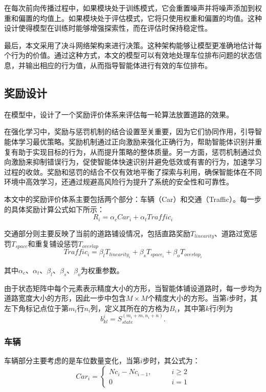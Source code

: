 在每次前向传播过程中，如果模块处于训练模式，它会重置噪声并将噪声添加到权重和偏置的均值上。如果模块处于评估模式，它将只使用权重和偏置的均值。这种设计使得模型在训练时能够增强探索性，而在评估时保持稳定性。

最后，本文采用了决斗网络架构来进行决策。这种架构能够让模型更准确地估计每个行为的价值。通过这种方式，本文的模型可以有效地处理车位排布问题的状态信息，并输出相应的行为值，从而指导智能体进行有效的车位排布。
\subsection{奖励设计}
在模型中，设计了一个奖励评价体系来评估每一轮算法放置道路的效果。

在强化学习中，奖励与惩罚机制的结合设置至关重要，因为它们协同作用，引导智能体学习最优策略。奖励机制通过正向激励来强化正确行为，帮助智能体识别并重复有助于实现目标的行为，从而提升策略的整体质量。另一方面，惩罚机制通过负向激励来抑制错误行为，促使智能体快速识别并避免低效或有害的行为，加速学习过程的收敛。奖励和惩罚的结合不仅有效地平衡了探索与利用，确保智能体在不同环境中高效学习，还通过规避高风险行为提升了系统的安全性和可靠性。

本文中的奖励评价体系主要包括两个部分：车辆（Car）和交通（Traffic）\cite{zheng2023spatial}。每一步的具体奖励计算公式如下所示：
\begin{equation}
    \label{reward}
    R_i = \alpha_c Car_i + \alpha_t Traffic_i
\end{equation}

交通部分则主要反映了当前的道路铺设情况，包括直路奖励$T_{linearity}$、道路过宽惩罚$T_{space}$和重复铺设惩罚$T_{overlap}$
\begin{equation}
    Traffic_i = \beta_l T_{linearity_i} + \beta_s T_{space_i} + \beta_o T_{overlap_i}
\end{equation}

其中$\alpha_c$、$\alpha_t$、$\beta_l$、$\beta_s$、$\beta_o$为权重参数。

由于状态矩阵中每个元素表示精度大小的方形，当智能体铺设道路时，每一步均为道路宽度大小的方形，因此一步中包含$M\times M$个精度大小的方形。当第$i$步时，其左下角标记点位于第$m_i$行$n_i$列，定义其所在的方格为$B_i$，其中第$k$行$l$列为$$b^{i}_{kl} = S_{state}^{(m_i+m,n_i+n)}.$$

\subsubsection{车辆}
车辆部分主要考虑的是车位数量变化，当第$i$步时，其公式为：
\begin{equation}
    \label{car_num}
    Car_i = \left\{
    \begin{array}{ll}
        Nc_i - Nc_{i-1},\quad & \quad i \geq 2 \\
        0\quad                          & \quad i = 1
    \end{array}
    \right.
\end{equation}

